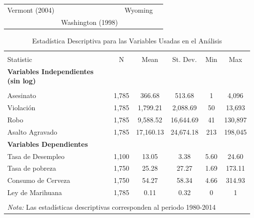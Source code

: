 \documentclass[11pt,]{article}
\begin{document}
\begin{longtable}[]{@{}llll@{}}
\begin{minipage}[t]{0.26\columnwidth}
Vermont (2004)\strut
\end{minipage} & \begin{minipage}[t]{0.24\columnwidth}\raggedright
\strut
\end{minipage} & \begin{minipage}[t]{0.19\columnwidth}\raggedright
Wyoming\strut
\end{minipage}\tabularnewline
\begin{minipage}[t]{0.20\columnwidth}\raggedright
\strut
\end{minipage} & \begin{minipage}[t]{0.26\columnwidth}\raggedright
Washington (1998)\strut
\end{minipage} & \begin{minipage}[t]{0.24\columnwidth}\raggedright
\strut
\end{minipage} & \begin{minipage}[t]{0.19\columnwidth}\raggedright
\strut
\end{minipage}\tabularnewline
\bottomrule
\end{longtable}

\begin{table}[!htbp] \centering 
  \caption{Estadística Descriptiva para las Variables Usadas en el Análisis} 
  \label{tab:descript} 
\small 
\begin{tabular}{@{\extracolsep{5pt}}lccccc} 
\\[-1.8ex]\hline \\[-1.8ex] 
Statistic & \multicolumn{1}{c}{N} & \multicolumn{1}{c}{Mean} & \multicolumn{1}{c}{St. Dev.} & \multicolumn{1}{c}{Min} & \multicolumn{1}{c}{Max} \\ 
\hline 
\hline
{\bf Variables Independientes (sin log)} & & & & & \\
\hline \\[-1.8ex] 
Asesinato & 1,785 & 366.68 & 513.68 & 1 & 4,096 \\ 
Violación & 1,785 & 1,799.21 & 2,088.69 & 50 & 13,693 \\ 
Robo & 1,785 & 9,588.52 & 16,644.69 & 41 & 130,897 \\ 
Asalto Agravado & 1,785 & 17,160.13 & 24,674.18 & 213 & 198,045 \\ 
\hline
{\bf Variables Dependientes} & & & & & \\
\hline
Tasa de Desempleo & 1,100 & 13.05 & 3.38 & 5.60 & 24.60 \\ 
Tasa de pobreza & 1,750 & 25.28 & 27.27 & 1.69 & 173.11 \\ 
Consumo de Cerveza & 1,750 & 54.27 & 58.34 & 4.66 & 314.93 \\ 
Ley de Marihuana & 1,785 & 0.11 & 0.32 & 0 & 1 \\ 
\hline 
\hline \\[-1.8ex] 
\multicolumn{6}{l}{\textit{Nota:} Las estadísticas descriptivas corresponden al periodo 1980-2014} \\ 
\end{tabular} 
\end{table}
\end{document}
